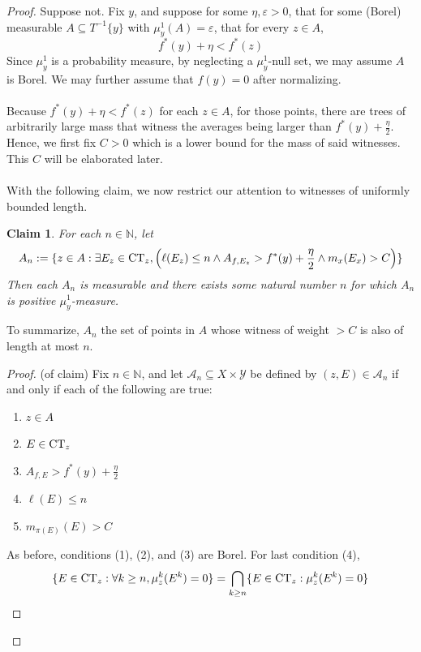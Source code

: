 \documentclass{article}
\newcommand{\CT}{\textmd{CT}}
\newtheorem{claim}[theorem]{Claim}
\theoremstyle{definition}
\begin{document}
\begin{proof}
    Suppose not. Fix $ y $, and suppose for some $ \eta,\varepsilon>0 $, that for some (Borel) measurable $ A\subseteq T^{-1}\{y\} $ with $ \mu^1_y (A) = \varepsilon $, that for every $ z\in A $,
    \[
    f^*(y) + \eta < f^*(z)
    \]
    Since $ \mu^1_y $ is a probability measure, by neglecting a $ \mu^1_y $-null set, we may assume $ A $ is Borel. We may further assume that $ f(y) = 0 $ after normalizing.\\\\
    Because $ f^*(y)+\eta < f^*(z) $ for each $ z\in A $, for those points, there are trees of arbitrarily large mass that witness the averages being larger than $ f^*(y) + \frac{\eta}{2} $. Hence, we first fix $ C >0 $ which is a lower bound for the mass of said witnesses. This $ C $ will be elaborated later. \\\\
    With the following claim, we now restrict our attention to witnesses of uniformly bounded length.
    \begin{claim}
        For each $ n\in \mathbb{N} $, let
        \[
        A_n:=\{z\in A:\exists E_z\in \CT_z,\left(\ell(E_z)\leq n\wedge A_{f,E_z} > f^*(y) + \frac{\eta}{2}\wedge m_x(E_x) > C\right)\}
        \]
        Then each $ A_n $ is measurable and there exists some natural number $ n $ for which $ A_n $ is positive $ \mu^1_y $-measure.
    \end{claim}
    \noindent To summarize, $ A_n $ the set of points in $ A $ whose witness of weight $ > C $ is also of length at most $ n $.
    \begin{proof}
        (of claim) Fix $ n\in \mathbb{N} $, and let $ \mathcal{A}_n \subseteq X\times \mathcal{Y} $ be defined by $ (z,E)\in \mathcal{A}_n $ if and only if each of the following are true:
        \begin{enumerate}
            \item $ z\in A $
            \item $ E\in \CT_z $
            \item $ A_{f,E} >f^*(y) + \frac{\eta}{2} $
            \item $ \ell(E) \leq n $
            \item $ m_{\pi(E)} (E) > C$
        \end{enumerate}
        As before, conditions (1), (2), and (3)  are Borel. For last condition (4), 
        \[
        \{E\in \CT_z:\forall k\geq n,\mu^k_z(E^k) = 0\} = \bigcap_{k\geq n} \{E\in \CT_z: \mu^k_z(E^k) = 0\}
        \]

\end{proof}
\end{proof}
\end{document}
